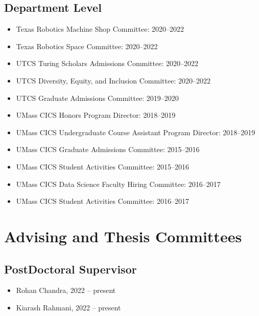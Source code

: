 \documentclass[Times]{article}
\begin{document}
\subsection*{Department Level}
\begin{itemize}
 \item Texas Robotics Machine Shop Committee: 2020--2022
 \item Texas Robotics Space Committee: 2020--2022
 \item UTCS Turing Scholars Admissions Committee: 2020--2022
 \item UTCS Diversity, Equity, and Inclusion Committee: 2020--2022
 \item UTCS Graduate Admissions Committee: 2019--2020
 \item UMass CICS Honors Program Director: 2018--2019
 \item UMass CICS Undergraduate Course Assistant Program Director: 2018--2019
 \item UMass CICS Graduate Admissions Committee: 2015--2016
 \item UMass CICS Student Activities Committee: 2015--2016
 \item UMass CICS Data Science Faculty Hiring Committee: 2016--2017
 \item UMass CICS Student Activities Committee: 2016--2017
\end{itemize}

\section*{Advising and Thesis Committees}

\subsection*{PostDoctoral Supervisor}
\begin{itemize}
 \item Rohan Chandra, 2022 -- present
 \item Kiarash Rahmani, 2022 -- present
\end{itemize}
\end{document}

